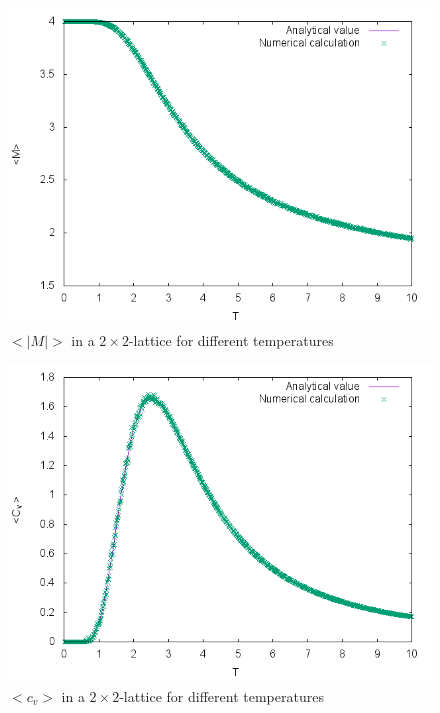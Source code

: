 \documentclass[10pt,a4paper]{article}
\begin{document}
\begin{figure}[h]
	\includegraphics[width=\textwidth]{Magnetization.png}
	\caption{$<|M|>$ in a $2\times 2$-lattice for different temperatures\label{b_M}}
\end{figure}
\begin{figure}[h]
	\includegraphics[width=\textwidth]{Heat_capacity.png}
	\caption{$<c_v>$ in a $2\times 2$-lattice for different temperatures\label{b_Cv}}
\end{figure}
\end{document}
